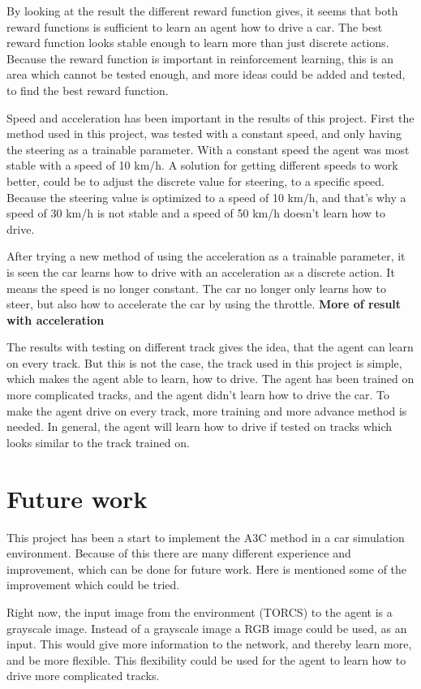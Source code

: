By looking at the result the different reward function gives, it seems that both reward functions is sufficient to learn an agent how to drive a car. The best reward function looks stable enough to learn more than just discrete actions. Because the reward function is important in reinforcement learning, this is an area which cannot be tested enough, and more ideas could be added and tested, to find the best reward function. 

Speed and acceleration has been important in the results of this project. First the method used in this project, was tested with a constant speed, and only having the steering as a trainable parameter. With a constant speed the agent was most stable with a speed of 10 km/h. A solution for getting different speeds to work better, could be to adjust the discrete value for steering, to a specific speed. Because the steering value is optimized to a speed of 10 km/h, and that’s why a speed of 30 km/h is not stable and a speed of 50 km/h doesn't learn how to drive. 

After trying a new method of using the acceleration as a trainable parameter, it is seen the car learns how to drive with an acceleration as a discrete action. It means the speed is no longer constant. The car no longer only learns how to steer, but also how to accelerate the car by using the throttle. \textbf{More of result with acceleration}

The results with testing on different track gives the idea, that the agent can learn on every track. But this is not the case, the track used in this project is simple, which makes the agent able to learn, how to drive. The agent has been trained on more complicated tracks, and the agent didn't learn how to drive the car. To make the agent drive on every track, more training and more advance method is needed. In general, the agent will learn how to drive if tested on tracks which looks similar to the track trained on. 
 
\section{Future work}
This project has been a start to implement the A3C method in a car simulation environment. Because of this there are many different experience and improvement, which can be done for future work. Here is mentioned some of the improvement which could be tried.  

Right now, the input image from the environment (TORCS) to the agent is a grayscale image. Instead of a grayscale image a RGB image could be used, as an input. This would give more information to the network, and thereby learn more, and be more flexible. This flexibility could be used for the agent to learn how to drive more complicated tracks.  

